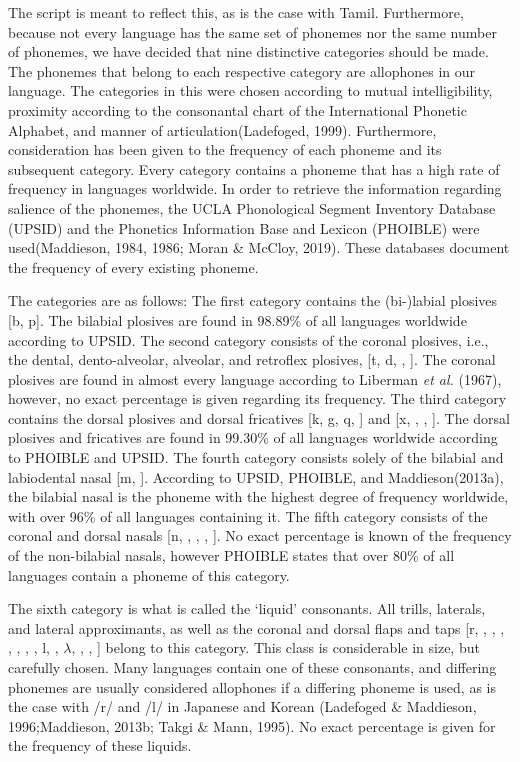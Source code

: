 The script is meant to reflect this, as is the case with Tamil. Furthermore, because not every language has the same set of phonemes nor the same number of phonemes, we have decided that nine distinctive categories should be made. The phonemes that belong to each respective category are allophones in our language. The categories in this were chosen according to mutual intelligibility, proximity according to the consonantal chart of the International Phonetic Alphabet, and manner of articulation(Ladefoged, 1999). Furthermore, consideration has been given to the frequency of each phoneme and its subsequent category. Every category contains a phoneme that has a high rate of frequency in languages worldwide. In order to retrieve the information regarding salience of the phonemes, the UCLA Phonological Segment Inventory Database (UPSID) and the Phonetics Information Base and Lexicon (PHOIBLE) were used(Maddieson, 1984, 1986; Moran \& McCloy, 2019). These databases document the frequency of every existing phoneme. 

The categories are as follows: The first category contains the (bi-)labial plosives [b, p]. The bilabial plosives are found  in 98.89\% of all languages worldwide according to UPSID. The second category consists of the coronal plosives, i.e., the dental, dento-alveolar, alveolar, and retroflex plosives, [t, d, \textrtailt, \textrtaild]. The coronal plosives are found  in almost every language according to Liberman \textit{et al.} (1967), however, no exact percentage is given regarding its frequency. The third category contains the dorsal plosives and dorsal fricatives [k, g, q, \textscg] and [x, \textgamma, \textchi, \textinvscr]. The dorsal plosives and fricatives are found  in 99.30\% of all languages worldwide according to PHOIBLE and UPSID. The fourth category consists solely of the bilabial and labiodental nasal [m, \textltailm]. According to UPSID, PHOIBLE, and Maddieson(2013a), the bilabial nasal is the phoneme with the highest degree of frequency worldwide, with over 96\% of all languages containing it. The fifth category consists of the coronal and dorsal nasals [n, \textrtailn ,  \textltailn, \ng, \textscn]. No exact percentage is known of the frequency of the non-bilabial nasals, however PHOIBLE states that over 80\% of all languages contain a phoneme of this category. 

The sixth category is what is called the ‘liquid’ consonants. All trills, laterals, and lateral approximants, as well as the coronal and dorsal flaps and taps [r, \textscr , \textfishhookr, \textrtailr, \textbeltl, \textlyoghlig, \textturnr, \textturnrrtail, l, \textrtaill, $\lambda$, \textscl, \textturnmrleg,  \textturnlonglegr] belong to this category. This class is considerable in size, but carefully chosen. Many languages contain one of these consonants, and differing phonemes are usually considered allophones if a differing phoneme is used, as is the case with /r/ and /l/ in Japanese and Korean (Ladefoged \& Maddieson, 1996;Maddieson, 2013b; Takgi \& Mann, 1995). No exact percentage is given for the frequency of these liquids. 

